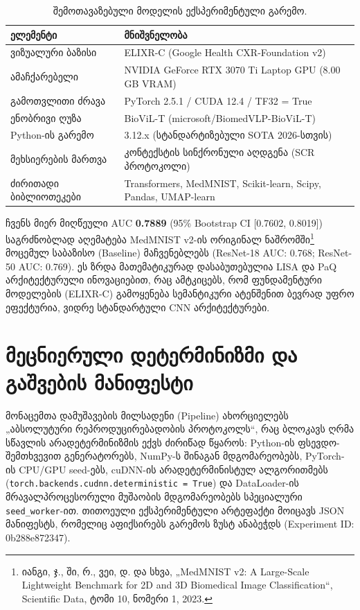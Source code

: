 \documentclass[12pt,a4paper,oneside]{report}
\begin{document}
\begin{table}[H]
\centering
\caption{შემოთავაზებული მოდელის ექსპერიმენტული გარემო.}
\begin{tabularx}{\textwidth}{>{\raggedright\arraybackslash}p{} L}
\toprule
\textbf{ელემენტი} & \textbf{მნიშვნელობა} \\
\midrule
ვიზუალური ბაზისი & ELIXR-C (Google Health CXR-Foundation v2) \\
ამაჩქარებელი & NVIDIA GeForce RTX 3070 Ti Laptop GPU (8.00 GB VRAM) \\
გამოთვლითი ძრავა & PyTorch 2.5.1 / CUDA 12.4 / TF32 = True \\
ენობრივი ღუზა & BioViL-T (microsoft/BiomedVLP-BioViL-T) \\
Python-ის გარემო & 3.12.x (სტანდარტიზებული SOTA 2026-სთვის) \\
მეხსიერების მართვა & კონტექსტის სინქრონული აღდგენა (SCR პროტოკოლი) \\
ძირითადი ბიბლიოთეკები & Transformers, MedMNIST, Scikit-learn, Scipy, Pandas, UMAP-learn \\
\bottomrule
\end{tabularx}
\end{table}

ჩვენს მიერ მიღწეული AUC \textbf{0.7889} (95\% Bootstrap CI [0.7602, 0.8019]) საგრძნობლად აღემატება MedMNIST v2-ის ორიგინალ ნაშრომში\footnote{იანგი, ჯ., ში, რ., ვეი, დ. და სხვა, „MedMNIST v2: A Large-Scale Lightweight Benchmark for 2D and 3D Biomedical Image Classification“, Scientific Data, ტომი 10, ნომერი 1, 2023.} მოცემულ საბაზისო (Baseline) მაჩვენებლებს (ResNet-18 AUC: 0.768; ResNet-50 AUC: 0.769). ეს ზრდა მათემატიკურად დასაბუთებულია LISA და PaQ არქიტექტურული ინოვაციებით, რაც ამტკიცებს, რომ ფუნდამენტური მოდელების (ELIXR-C) გამოყენება სემანტიკური ატენშენით ბევრად უფრო ეფექტურია, ვიდრე სტანდარტული CNN არქიტექტურები.

\section{მეცნიერული დეტერმინიზმი და გაშვების მანიფესტი}
მონაცემთა დამუშავების მილსადენი (Pipeline) ახორციელებს „აბსოლუტური რეპროდუცირებადობის პროტოკოლს“, რაც ბლოკავს ღრმა სწავლის არადეტერმინიზმის ექვს ძირიწად წყაროს: Python-ის ფსევდო-შემთხვევით გენერატორებს, NumPy-ს შინაგან მდგომარეობებს, PyTorch-ის CPU/GPU seed-ებს, cuDNN-ის არადეტერმინისტულ ალგორითმებს (\texttt{torch.backends.cudnn.deterministic = True}) და DataLoader-ის მრავალპროცესორული მუშაობის მდგომარეობებს სპეციალური \texttt{seed\_worker}-ით. თითოეული ექსპერიმენტული არტეფაქტი მოიცავს JSON მანიფესტს, რომელიც აფიქსირებს გარემოს ზუსტ ანაბეჭდს (Experiment ID: 0b288e872347).
\end{document}
